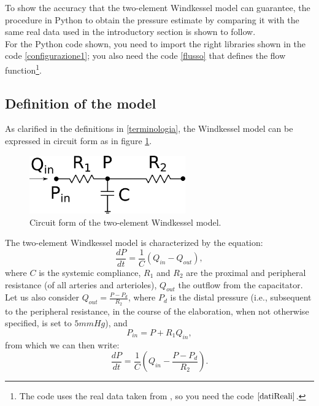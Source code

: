 \vspace{1cm}
To show the accuracy that the two-element Windkessel model can guarantee, the procedure in Python to obtain the pressure estimate by comparing it with the same real data used in the introductory section is shown to follow.\\
For the Python code shown, you need to import the right libraries shown in the code \ref{configurazione1}; you also need the code \ref{flusso} that defines the flow function\footnote{The code uses the real data taken from \cite{westerhof_arterial_2008}, so you need the code $\ref{datiReali}$.}.


\newpage

\subsection{Definition of the model}
As clarified in the definitions in \ref{terminologia}, the Windkessel model can be expressed in circuit form as in figure \ref{circuito}.

\vspace{1cm}

\begin{figure}[h]
    \centering
    \includegraphics[width=0.6\textwidth]{images/Windkessel/Windkessel2Element.png}
    \caption{Circuit form of the two-element Windkessel model.}
    \label{circuito}
\end{figure}

The two-element Windkessel model is characterized by the equation:
\[
\frac{dP}{dt}=\frac{1}{C}(Q_{in}-Q_{out}),
\]
where $C$ is the systemic compliance, $R_1$ and $R_2$ are the proximal and peripheral resistance (of all arteries and arterioles), $Q_{out}$ the outflow from the capacitator.\\
Let us also consider $Q_{out}=\frac{P-P_d}{R_2}$, where $P_d$ is the distal pressure (i.e., subsequent to the peripheral resistance, in the course of the elaboration, when not otherwise specified, is set to $5 mmHg$), and
\begin{equation}\label{Pin}
    P_{in}=P+R_1Q_{in},
\end{equation}
from which we can then write:
\begin{equation}\label{equation}
\frac{dP}{dt}=\frac{1}{C}\left( Q_{in}-\frac{P-P_d}{R_2}\right).
\end{equation}



